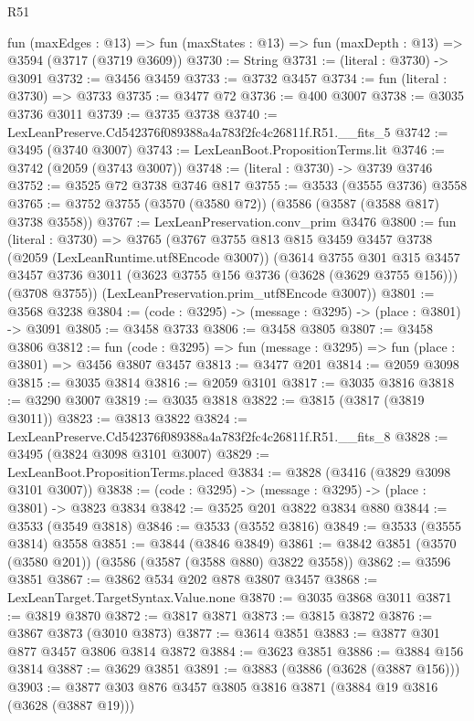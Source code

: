 \begin{lexlean}{R51}
\begin{coremodule}
  fun (maxEdges : @13) =>
  fun (maxStates : @13) => fun (maxDepth : @13) => @3594 (@3717 (@3719 @3609))
@3730 := String
@3731 := (literal : @3730) -> @3091
@3732 := @3456 @3459
@3733 := @3732 @3457
@3734 := fun (literal : @3730) => @3733
@3735 := @3477 @72
@3736 := @400 @3007
@3738 := @3035 @3736 @3011
@3739 := @3735 @3738
@3740 := LexLeanPreserve.Cd542376f089388a4a783f2fc4c26811f.R51.__fits_5
@3742 := @3495 (@3740 @3007)
@3743 := LexLeanBoot.PropositionTerms.lit
@3746 := @3742 (@2059 (@3743 @3007))
@3748 := (literal : @3730) -> @3739 @3746
@3752 := @3525 @72 @3738 @3746 @817
@3755 := @3533 (@3555 @3736) @3558
@3765 := @3752 @3755 (@3570 (@3580 @72)) (@3586 (@3587 (@3588 @817) @3738 @3558))
@3767 := LexLeanPreservation.conv_prim @3476
@3800 := fun (literal : @3730) =>
  @3765
    (@3767
      @3755
      @813
      @815
      @3459
      @3457
      @3738
      (@2059 (LexLeanRuntime.utf8Encode @3007))
      (@3614
        @3755
        @301
        @315
        @3457
        @3457
        @3736
        @3011
        (@3623 @3755 @156 @3736 (@3628 (@3629 @3755 @156)))
        (@3708 @3755))
      (LexLeanPreservation.prim_utf8Encode @3007))
@3801 := @3568 @3238
@3804 := (code : @3295) -> (message : @3295) -> (place : @3801) -> @3091
@3805 := @3458 @3733
@3806 := @3458 @3805
@3807 := @3458 @3806
@3812 := fun (code : @3295) => fun (message : @3295) => fun (place : @3801) => @3456 @3807 @3457
@3813 := @3477 @201
@3814 := @2059 @3098
@3815 := @3035 @3814
@3816 := @2059 @3101
@3817 := @3035 @3816
@3818 := @3290 @3007
@3819 := @3035 @3818
@3822 := @3815 (@3817 (@3819 @3011))
@3823 := @3813 @3822
@3824 := LexLeanPreserve.Cd542376f089388a4a783f2fc4c26811f.R51.__fits_8
@3828 := @3495 (@3824 @3098 @3101 @3007)
@3829 := LexLeanBoot.PropositionTerms.placed
@3834 := @3828 (@3416 (@3829 @3098 @3101 @3007))
@3838 := (code : @3295) -> (message : @3295) -> (place : @3801) -> @3823 @3834
@3842 := @3525 @201 @3822 @3834 @880
@3844 := @3533 (@3549 @3818)
@3846 := @3533 (@3552 @3816)
@3849 := @3533 (@3555 @3814) @3558
@3851 := @3844 (@3846 @3849)
@3861 := @3842 @3851 (@3570 (@3580 @201)) (@3586 (@3587 (@3588 @880) @3822 @3558))
@3862 := @3596 @3851
@3867 := @3862 @534 @202 @878 @3807 @3457
@3868 := LexLeanTarget.TargetSyntax.Value.none
@3870 := @3035 @3868 @3011
@3871 := @3819 @3870
@3872 := @3817 @3871
@3873 := @3815 @3872
@3876 := @3867 @3873 (@3010 @3873)
@3877 := @3614 @3851
@3883 := @3877 @301 @877 @3457 @3806 @3814 @3872
@3884 := @3623 @3851
@3886 := @3884 @156 @3814
@3887 := @3629 @3851
@3891 := @3883 (@3886 (@3628 (@3887 @156)))
@3903 := @3877 @303 @876 @3457 @3805 @3816 @3871 (@3884 @19 @3816 (@3628 (@3887 @19)))

\end{coremodule}
\end{lexlean}
